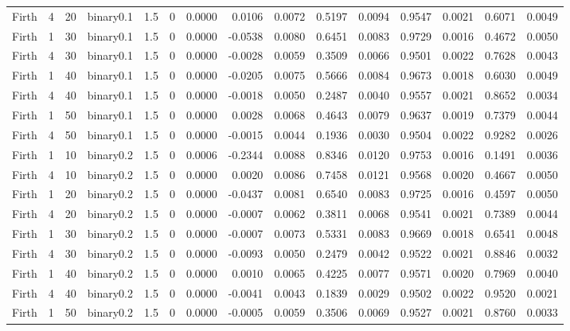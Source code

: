 \begin{longtable}{rrrrrrrrrrrrrrr}
  Firth & 4 & 20 & binary0.1 & 1.5 & 0 & 0.0000 & 0.0106 & 0.0072 & 0.5197 & 0.0094 & 0.9547 & 0.0021 & 0.6071 & 0.0049 \\ 
  Firth & 1 & 30 & binary0.1 & 1.5 & 0 & 0.0000 & -0.0538 & 0.0080 & 0.6451 & 0.0083 & 0.9729 & 0.0016 & 0.4672 & 0.0050 \\ 
  Firth & 4 & 30 & binary0.1 & 1.5 & 0 & 0.0000 & -0.0028 & 0.0059 & 0.3509 & 0.0066 & 0.9501 & 0.0022 & 0.7628 & 0.0043 \\ 
  Firth & 1 & 40 & binary0.1 & 1.5 & 0 & 0.0000 & -0.0205 & 0.0075 & 0.5666 & 0.0084 & 0.9673 & 0.0018 & 0.6030 & 0.0049 \\ 
  Firth & 4 & 40 & binary0.1 & 1.5 & 0 & 0.0000 & -0.0018 & 0.0050 & 0.2487 & 0.0040 & 0.9557 & 0.0021 & 0.8652 & 0.0034 \\ 
  Firth & 1 & 50 & binary0.1 & 1.5 & 0 & 0.0000 & 0.0028 & 0.0068 & 0.4643 & 0.0079 & 0.9637 & 0.0019 & 0.7379 & 0.0044 \\ 
  Firth & 4 & 50 & binary0.1 & 1.5 & 0 & 0.0000 & -0.0015 & 0.0044 & 0.1936 & 0.0030 & 0.9504 & 0.0022 & 0.9282 & 0.0026 \\ 
  Firth & 1 & 10 & binary0.2 & 1.5 & 0 & 0.0006 & -0.2344 & 0.0088 & 0.8346 & 0.0120 & 0.9753 & 0.0016 & 0.1491 & 0.0036 \\ 
  Firth & 4 & 10 & binary0.2 & 1.5 & 0 & 0.0000 & 0.0020 & 0.0086 & 0.7458 & 0.0121 & 0.9568 & 0.0020 & 0.4667 & 0.0050 \\ 
  Firth & 1 & 20 & binary0.2 & 1.5 & 0 & 0.0000 & -0.0437 & 0.0081 & 0.6540 & 0.0083 & 0.9725 & 0.0016 & 0.4597 & 0.0050 \\ 
  Firth & 4 & 20 & binary0.2 & 1.5 & 0 & 0.0000 & -0.0007 & 0.0062 & 0.3811 & 0.0068 & 0.9541 & 0.0021 & 0.7389 & 0.0044 \\ 
  Firth & 1 & 30 & binary0.2 & 1.5 & 0 & 0.0000 & -0.0007 & 0.0073 & 0.5331 & 0.0083 & 0.9669 & 0.0018 & 0.6541 & 0.0048 \\ 
  Firth & 4 & 30 & binary0.2 & 1.5 & 0 & 0.0000 & -0.0093 & 0.0050 & 0.2479 & 0.0042 & 0.9522 & 0.0021 & 0.8846 & 0.0032 \\ 
  Firth & 1 & 40 & binary0.2 & 1.5 & 0 & 0.0000 & 0.0010 & 0.0065 & 0.4225 & 0.0077 & 0.9571 & 0.0020 & 0.7969 & 0.0040 \\ 
  Firth & 4 & 40 & binary0.2 & 1.5 & 0 & 0.0000 & -0.0041 & 0.0043 & 0.1839 & 0.0029 & 0.9502 & 0.0022 & 0.9520 & 0.0021 \\ 
  Firth & 1 & 50 & binary0.2 & 1.5 & 0 & 0.0000 & -0.0005 & 0.0059 & 0.3506 & 0.0069 & 0.9527 & 0.0021 & 0.8760 & 0.0033 \\ 

\end{longtable}
